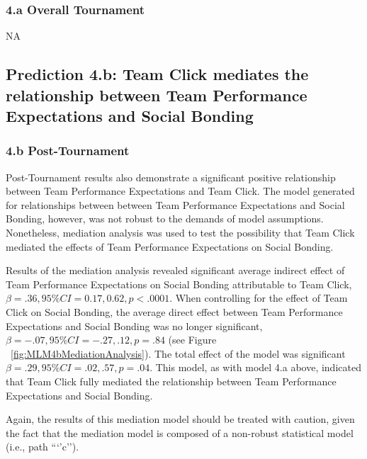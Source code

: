 \begin{landscape}
  \subsubsection{4.a Overall Tournament}
NA









\subsection{Prediction 4.b: Team Click mediates the relationship between Team Performance Expectations and Social Bonding}

    \subsubsection{4.b Post-Tournament}
  Post-Tournament results also demonstrate a significant positive relationship between Team Performance Expectations and Team Click. The model generated for relationships between between Team Performance Expectations and Social Bonding, however, was not robust to the demands of model assumptions.   Nonetheless, mediation analysis was used to test the possibility that Team Click mediated the effects of Team Performance Expectations on Social Bonding.

  Results of the mediation analysis revealed significant average indirect effect of Team Performance Expectations on Social Bonding attributable to Team Click, $\beta = .36, 95\% CI = 0.17 , 0.62, p < .0001$.  When controlling for the effect of Team Click on Social Bonding, the average direct effect between Team Performance Expectations and Social Bonding was no longer significant, $\beta = -.07, 95\% CI = -.27 , .12, p = .84 $ (see Figure ~\ref{fig:MLM4bMediationAnalysis}). The total effect of the model was significant $\beta = .29, 95\% CI = .02 , .57, p = .04$.  This model, as with model 4.a above, indicated that Team Click fully mediated the relationship between Team Performance Expectations and Social Bonding.


  Again, the results of this mediation model should be treated with caution, given the fact that the mediation model is composed of a non-robust statistical model (i.e., path ```'c'').


\end{landscape}
